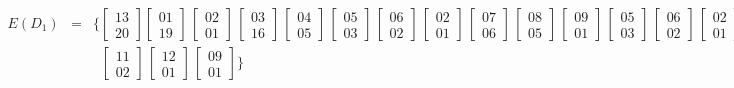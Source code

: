 \[\begin{array}{rcl}
E(D_1) &=& \{ \begin{bmatrix} 13 \\ 20 \end{bmatrix} \begin{bmatrix} 01 \\ 19 \end{bmatrix}\,\begin{bmatrix} 02 \\ 01 \end{bmatrix}\,\begin{bmatrix} 03 \\ 16 \end{bmatrix}\,\begin{bmatrix} 04 \\ 05 \end{bmatrix}\,\begin{bmatrix} 05 \\ 03 \end{bmatrix}\,\begin{bmatrix} 06 \\ 02 \end{bmatrix}\,\begin{bmatrix} 02 \\ 01 \end{bmatrix}\,\begin{bmatrix} 07 \\ 06 \end{bmatrix}\,\begin{bmatrix} 08 \\ 05 \end{bmatrix}\,\begin{bmatrix} 09 \\ 01 \end{bmatrix}\,\begin{bmatrix} 05 \\ 03 \end{bmatrix}\,\begin{bmatrix} 06 \\ 02 \end{bmatrix}\,\begin{bmatrix} 02 \\ 01 \end{bmatrix}\,\begin{bmatrix} 10 \\ 03 \end{bmatrix}\,\\[1em] & & \;\;\begin{bmatrix} 11 \\ 02 \end{bmatrix}\,\begin{bmatrix} 12 \\ 01 \end{bmatrix}\,\begin{bmatrix} 09 \\ 01 \end{bmatrix} \} \\[1.8em]

\end{array}\]

